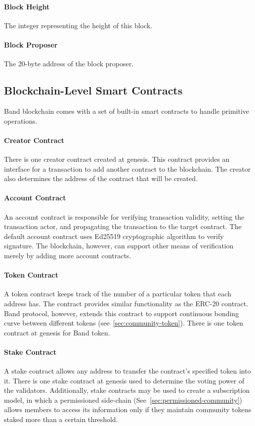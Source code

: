 \documentclass[letterpaper,11pt]{article}
\begin{document}
\paragraph{Block Height} The integer representing the height of this block.
\paragraph{Block Proposer} The 20-byte address of the block proposer.

\subsection{Blockchain-Level Smart Contracts} \label{subsec:blockchain-level-contracts}
Band blockchain comes with a set of built-in smart contracts to handle primitive operations. 

\paragraph{Creator Contract} There is one creator contract created at genesis. This contract provides an interface for a transaction to add another contract to the blockchain. The creator also determines the address of the contract that will be created.

\paragraph{Account Contract} An account contract is responsible for verifying transaction validity, setting the transaction actor, and propagating the transaction to the target contract. The default account contract uses Ed25519 cryptographic algorithm to verify signature. The blockchain, however, can support other means of verification merely by adding more account contracts. 

\paragraph{Token Contract} A token contract keeps track of the number of a particular token that each address has. The contract provides similar functionality as the ERC-20 contract. Band protocol, however, extends this contract to support continuous bonding curve between different tokens (see~\ref{sec:community-token}). There is one token contract at genesis for Band token. 

\paragraph{Stake Contract} A stake contract allows any address to transfer the contract’s specified token into it. There is one stake contract at genesis used to determine the voting power of the validators. Additionally, stake contracts may be used to create a subscription model, in which a permissioned side-chain (See~\cref{sec:permissioned-community}) allows members to access its information only if they maintain community tokens staked more than a certain threshold.
\end{document}
